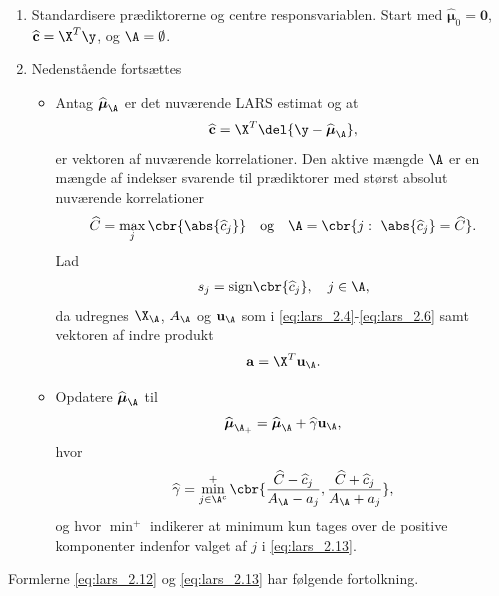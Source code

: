 \begin{alg} 
\begin{enumerate}
\item Standardisere prædiktorerne og centre responsvariablen. 
Start med \(\widehat{\boldsymbol{\mu}}_0 = \mathbf{0}\), \(\widehat{\mathbf{c}} = \X^T \y\), og \(\A = \emptyset\).
\item Nedenstående fortsættes
\begin{itemize}
\item Antag \(\widehat{\boldsymbol{\mu}}_\A\) er det nuværende LARS estimat og at
\begin{align}
\widehat{\mathbf{c}} = \X^T \del{\y - \widehat{\boldsymbol{\mu}}_\A}, \label{eq:lars_2.8}
\end{align} 
er vektoren af nuværende korrelationer.
Den aktive mængde \(\A\) er en mængde af indekser svarende til prædiktorer med størst absolut nuværende korrelationer
\begin{align}
\widehat{C} = \max_j \cbr{\abs{\widehat{c}_j}} \quad \text{og} \quad \A= \cbr{j: \ \abs{ \widehat{c}_j} = \widehat{C}}. \label{eq:lars_2.9}
\end{align}
Lad 
\begin{align*}
s_j = \text{sign} \cbr{\widehat{c}_j}, \quad j \in \A,
\end{align*}
da udregnes \(\X_\A\), \(A_\A\) og \(\mathbf{u}_\A\) som i \eqref{eq:lars_2.4}-\eqref{eq:lars_2.6}  samt vektoren af indre produkt
\begin{align*}
\mathbf{a} = \X^T \mathbf{u}_\A.
\end{align*}
\item Opdatere \(\widehat{\boldsymbol{\mu}}_\A\) til
\begin{align}
\widehat{\boldsymbol{\mu}}_{\A_+} = \widehat{\boldsymbol{\mu}}_\A + \widehat{\gamma} \mathbf{u}_\A, \label{eq:lars_2.12}
\end{align}
hvor 
\begin{align}
\widehat{\gamma} = \min_{j \in \A^c}^+ \cbr{ \frac{\widehat{C}- \widehat{c}_j}{A_\A - a_j} , \frac{\widehat{C} + \widehat{c}_j}{A_\A + a_j}}, \label{eq:lars_2.13}
\end{align}
og hvor \(\min^+\) indikerer at minimum kun tages over de positive komponenter indenfor valget af \(j\) i \eqref{eq:lars_2.13}.
\end{itemize}
\end{enumerate}
\end{alg}
%
Formlerne \eqref{eq:lars_2.12} og \eqref{eq:lars_2.13} har følgende fortolkning.

